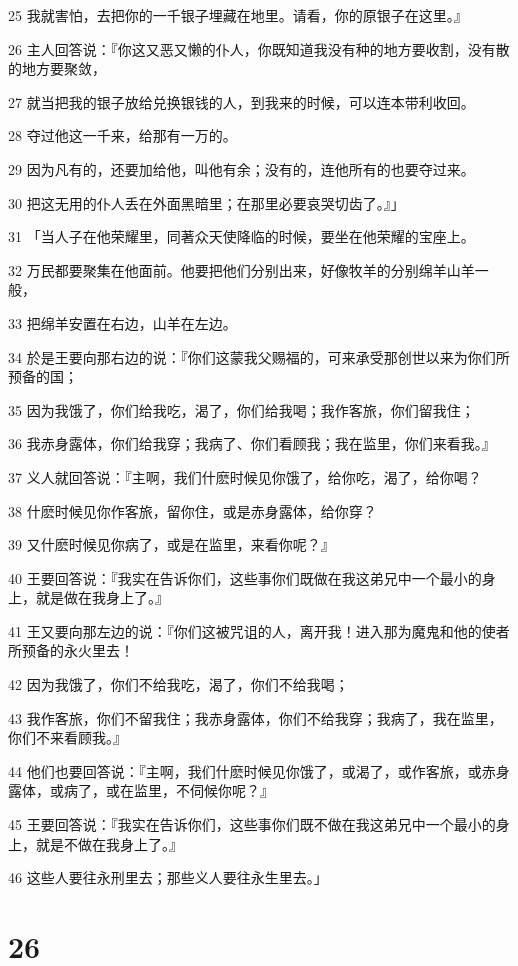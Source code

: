 \par 25 我就害怕，去把你的一千银子埋藏在地里。请看，你的原银子在这里。』
\par 26 主人回答说：『你这又恶又懒的仆人，你既知道我没有种的地方要收割，没有散的地方要聚敛，
\par 27 就当把我的银子放给兑换银钱的人，到我来的时候，可以连本带利收回。
\par 28 夺过他这一千来，给那有一万的。
\par 29 因为凡有的，还要加给他，叫他有余；没有的，连他所有的也要夺过来。
\par 30 把这无用的仆人丢在外面黑暗里；在那里必要哀哭切齿了。』」
\par 31 「当人子在他荣耀里，同著众天使降临的时候，要坐在他荣耀的宝座上。
\par 32 万民都要聚集在他面前。他要把他们分别出来，好像牧羊的分别绵羊山羊一般，
\par 33 把绵羊安置在右边，山羊在左边。
\par 34 於是王要向那右边的说：『你们这蒙我父赐福的，可来承受那创世以来为你们所预备的国；
\par 35 因为我饿了，你们给我吃，渴了，你们给我喝；我作客旅，你们留我住；
\par 36 我赤身露体，你们给我穿；我病了、你们看顾我；我在监里，你们来看我。』
\par 37 义人就回答说：『主啊，我们什麽时候见你饿了，给你吃，渴了，给你喝？
\par 38 什麽时候见你作客旅，留你住，或是赤身露体，给你穿？
\par 39 又什麽时候见你病了，或是在监里，来看你呢？』
\par 40 王要回答说：『我实在告诉你们，这些事你们既做在我这弟兄中一个最小的身上，就是做在我身上了。』
\par 41 王又要向那左边的说：『你们这被咒诅的人，离开我！进入那为魔鬼和他的使者所预备的永火里去！
\par 42 因为我饿了，你们不给我吃，渴了，你们不给我喝；
\par 43 我作客旅，你们不留我住；我赤身露体，你们不给我穿；我病了，我在监里，你们不来看顾我。』
\par 44 他们也要回答说：『主啊，我们什麽时候见你饿了，或渴了，或作客旅，或赤身露体，或病了，或在监里，不伺候你呢？』
\par 45 王要回答说：『我实在告诉你们，这些事你们既不做在我这弟兄中一个最小的身上，就是不做在我身上了。』
\par 46 这些人要往永刑里去；那些义人要往永生里去。」

\chapter{26}

